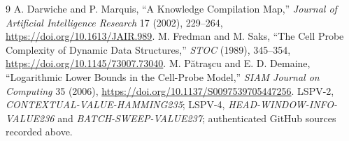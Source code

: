 \documentclass[10pt]{article}
\begin{document}
\begin{thebibliography}{9}
 A. Darwiche and P. Marquis, ``A Knowledge Compilation Map,'' \emph{Journal of Artificial Intelligence Research} 17 (2002), 229--264, \url{https://doi.org/10.1613/JAIR.989}.
 M. Fredman and M. Saks, ``The Cell Probe Complexity of Dynamic Data Structures,'' \emph{STOC} (1989), 345--354, \url{https://doi.org/10.1145/73007.73040}.
 M. P\u{a}tra\c{s}cu and E. D. Demaine, ``Logarithmic Lower Bounds in the Cell-Probe Model,'' \emph{SIAM Journal on Computing} 35 (2006), \url{https://doi.org/10.1137/S0097539705447256}.
 LSPV-2, \emph{CONTEXTUAL-VALUE-HAMMING235}; LSPV-4, \emph{HEAD-WINDOW-INFO-VALUE236} and \emph{BATCH-SWEEP-VALUE237}; authenticated GitHub sources recorded above.
\end{thebibliography}
\end{document}
